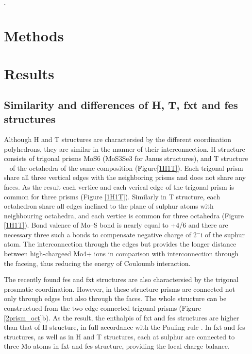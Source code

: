 .\documentclass[a4paperm]{article}
\begin{document}
		\section{Methods}



			\section{Results}

\subsection{Similarity and differences of H, T, fxt and fes structures}

Although H and T structures are charactersied by the different coordination polyhedrons, they are similar in the manner of their interconnection.
H structure consists of trigonal prisms MoS6 (MoS3Se3 for Janus structures), and T structure – of the octahedra of the same composition (Figure\ref{1H1T}).
Each trigonal prism share all three vertical edges with the neighboring prisms and does not share any faces.
As the result each vertice and each verical edge of the trigonal prism is common for three prisms (Figure \ref{1H1T}).
Similarly in T structure, each octahedron share all edges inclined to the plane of sulphur atoms with neighbouring octahedra, and each vertice is common for three octahedra (Figure \ref{1H1T}).
Bond valence of Mo--S bond is nearly equal to +4/6 and there are necessary three such a bonds to compensate negative charge of 2$^-$i of the suphur atom.
The interconnection through the edges but provides the longer distance between high-chargeed Mo4+ ions in comparison with interconnection through the faceing, thus reducing the energy of Couloumb interaction.

The recently found fes and fxt structures are also charactersied by the trigonal prosmatic coordination.
However, in these structure prisms are connected not only through edges but also through the faces.
The whole structure can be constructued from the two edge-connected trigonal prisms (Figure \ref{2prism_oct}b).
As the result, the enthalpis of fxt and fes structures are higher than that of H structure, in full accordance with the Pauling rule \cite{Pauling1929}.
In fxt and fes structures, as well as in H and T structures, each at sulphur are connected to three Mo atoms in fxt and fes structure, providing the local charge balance.
\end{document}
